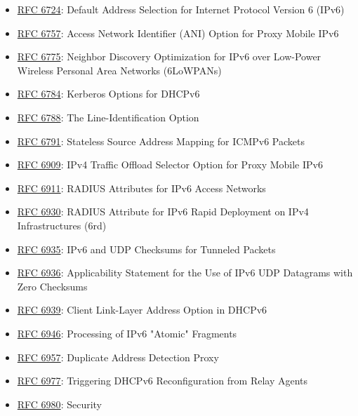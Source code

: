 \documentclass[
]{article}
\begin{document}
\begin{itemize}
  \href{https://www.rfc-editor.org/info/rfc6705}{RFC 6705}: Localized
  Routing for Proxy Mobile IPv6
\item
  \href{https://www.rfc-editor.org/info/rfc6724}{RFC 6724}: Default
  Address Selection for Internet Protocol Version 6 (IPv6)
\item
  \href{https://www.rfc-editor.org/info/rfc6757}{RFC 6757}: Access
  Network Identifier (ANI) Option for Proxy Mobile IPv6
\item
  \href{https://www.rfc-editor.org/info/rfc6775}{RFC 6775}: Neighbor
  Discovery Optimization for IPv6 over Low-Power Wireless Personal Area
  Networks (6LoWPANs)
\item
  \href{https://www.rfc-editor.org/info/rfc6784}{RFC 6784}: Kerberos
  Options for DHCPv6
\item
  \href{https://www.rfc-editor.org/info/rfc6788}{RFC 6788}: The
  Line-Identification Option
\item
  \href{https://www.rfc-editor.org/info/rfc6791}{RFC 6791}: Stateless
  Source Address Mapping for ICMPv6 Packets
\item
  \href{https://www.rfc-editor.org/info/rfc6909}{RFC 6909}: IPv4 Traffic
  Offload Selector Option for Proxy Mobile IPv6
\item
  \href{https://www.rfc-editor.org/info/rfc6911}{RFC 6911}: RADIUS
  Attributes for IPv6 Access Networks
\item
  \href{https://www.rfc-editor.org/info/rfc6930}{RFC 6930}: RADIUS
  Attribute for IPv6 Rapid Deployment on IPv4 Infrastructures (6rd)
\item
  \href{https://www.rfc-editor.org/info/rfc6935}{RFC 6935}: IPv6 and UDP
  Checksums for Tunneled Packets
\item
  \href{https://www.rfc-editor.org/info/rfc6936}{RFC 6936}:
  Applicability Statement for the Use of IPv6 UDP Datagrams with Zero
  Checksums
\item
  \href{https://www.rfc-editor.org/info/rfc6939}{RFC 6939}: Client
  Link-Layer Address Option in DHCPv6
\item
  \href{https://www.rfc-editor.org/info/rfc6946}{RFC 6946}: Processing
  of IPv6 "Atomic" Fragments
\item
  \href{https://www.rfc-editor.org/info/rfc6957}{RFC 6957}: Duplicate
  Address Detection Proxy
\item
  \href{https://www.rfc-editor.org/info/rfc6977}{RFC 6977}: Triggering
  DHCPv6 Reconfiguration from Relay Agents
\item
  \href{https://www.rfc-editor.org/info/rfc6980}{RFC 6980}: Security

\end{itemize}
\end{document}
